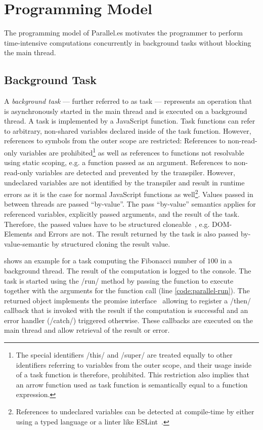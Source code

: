 \section{Programming Model}\label{sec:programming-model}
The programming model of Parallel.es motivates the programmer to perform time-intensive computations concurrently in background tasks without blocking the main thread. 

\subsection{Background Task}
A \textit{background task} --- further referred to as task --- represents an operation that is asynchronously started in the main thread and is executed on a background thread. A task is implemented by a JavaScript function. Task functions can refer to arbitrary, non-shared variables declared inside of the task function. However, references to symbols from the outer scope are restricted: References to non-read-only variables are prohibited\footnote{The special identifiers \javascriptinline/this/ and \javascriptinline/super/ are treated equally to other identifiers referring to variables from the outer scope, and their usage inside of a task function is therefore, prohibited. This restriction also implies that an arrow function used as task function is semantically equal to a function expression.} as well as references to functions not resolvable using static scoping, e.g. a function passed as an argument. References to non-read-only variables are detected and prevented by the transpiler. However, undeclared variables are not identified by the transpiler and result in runtime errors as it is the case for normal JavaScript functions as well\footnote{References to undeclared variables can be detected at compile-time by either using a typed language or a linter like ESLint~\cite{eslint}.}. Values passed in between threads are passed \enquote{by-value}. The pass \enquote{by-value} semantics applies for referenced variables, explicitly passed arguments, and the result of the task. Therefore, the passed values have to be structured cloneable~\cite[Section 2.9.4]{WHATWG2016}, e.g. DOM-Elements and Errors are not. The result returned by the task is also passed by-value-semantic by structured cloning the result value.

 shows an example for a task computing the Fibonacci number of $100$ in a background thread. The result of the computation is logged to the console. The task is started using the \javascriptinline/run/ method by passing the function to execute together with the arguments for the function call (line \ref{code:parallel-run}). The returned object implements the promise interface~\cite[Section 18.3.18]{ecmaScript2015} allowing to register a \javascriptinline/then/ callback that is invoked with the result if the computation is successful and an error handler (\javascriptinline/catch/) triggered otherwise. These callbacks are executed on the main thread and allow retrieval of the result or error. 


